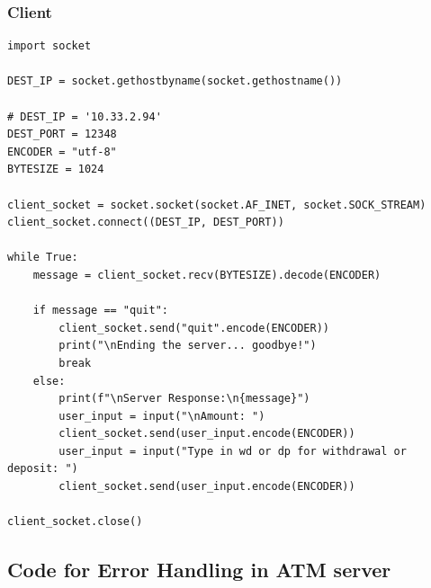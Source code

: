 \documentclass[11pt]{article}
\begin{document}
\subsubsection*{Client}
\begin{verbatim}
import socket

DEST_IP = socket.gethostbyname(socket.gethostname())

# DEST_IP = '10.33.2.94'
DEST_PORT = 12348
ENCODER = "utf-8"
BYTESIZE = 1024

client_socket = socket.socket(socket.AF_INET, socket.SOCK_STREAM)
client_socket.connect((DEST_IP, DEST_PORT))

while True:
    message = client_socket.recv(BYTESIZE).decode(ENCODER)

    if message == "quit":
        client_socket.send("quit".encode(ENCODER))
        print("\nEnding the server... goodbye!")
        break
    else:
        print(f"\nServer Response:\n{message}")
        user_input = input("\nAmount: ")
        client_socket.send(user_input.encode(ENCODER))
        user_input = input("Type in wd or dp for withdrawal or deposit: ")
        client_socket.send(user_input.encode(ENCODER))

client_socket.close()
\end{verbatim}
\subsection*{Code for Error Handling in ATM server}
\end{document}
